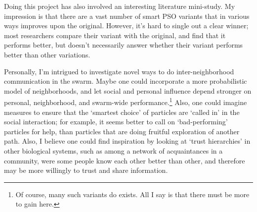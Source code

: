 \documentclass[a4paper,final,9pt]{article}
\begin{document}
Doing this project has also involved an interesting literature mini-study. 
My impression is that there are a vast number of smart PSO variants that in
various ways improves upon the original. However, it's hard to single out a
clear winner; most researchers compare their variant with the original, and
find that it performs better, but doesn't necessarily answer whether their
variant performs better than other variations. 

Personally, I'm intrigued to investigate novel ways to do inter-neighborhood
communication in the swarm.  Maybe one could incorporate a more probabilistic
model of neighborhoods, and let social and personal influence depend stronger
on personal, neighborhood, and swarm-wide performance.\footnote{Of course,
many such variants do exists. All I say is that there must be more to gain
here.} Also, one could imagine measures to ensure that the `smartest choice'
of particles are `called in' in the social interaction; for example, it seems
better to call on `bad-performing' particles for help, than particles that are
doing fruitful exploration of another path.  Also, I believe one could find
inspiration by
looking at `trust hierarchies' in other biological systems, such as among a
network of acquaintances in a community, were some people know each other
better than other, and therefore may be more willingly to trust and share
information.


{ \small  }
\end{document}
